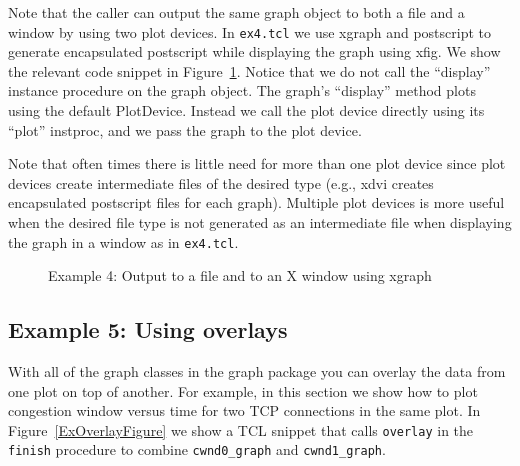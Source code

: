 \documentclass[11pt]{article}
\begin{document}
Note that the caller can output the same graph object to both a file
and a window by using two plot devices.  In \verb|ex4.tcl| we use xgraph
and postscript to generate encapsulated postscript while displaying
the graph using xfig.  We show the relevant code snippet in
Figure~\ref{Ex4Figure}.  Notice that we do not call the ``display''
instance procedure on the graph object.  The graph's ``display''
method plots using the default PlotDevice.  Instead we call the plot
device directly using its ``plot'' instproc, and we pass the graph
to the plot device.

Note that often times there is little need for more than one plot
device since plot devices create intermediate files of the desired
type (e.g., xdvi creates encapsulated postscript files for each graph).  
Multiple plot devices is more useful when the desired file type
is not generated as an intermediate file when displaying the graph in a
window as in \verb|ex4.tcl|.

\begin{figure}[ht]
\begin{center}
\end{center}
\caption{Example 4: Output to a file and to an X window using xgraph}\label{Ex4Figure}
\end{figure}

\subsection{Example 5: Using overlays}

With all of the graph classes in the graph package you can overlay the
data from one plot on top of another.  For example, in this section we
show how to plot congestion window versus time for two TCP connections
in the same plot.  In Figure~\ref{ExOverlayFigure} we show a TCL snippet
that calls \verb|overlay| in the \verb|finish| procedure to combine
\verb|cwnd0_graph| and \verb|cwnd1_graph|.
\end{document}
